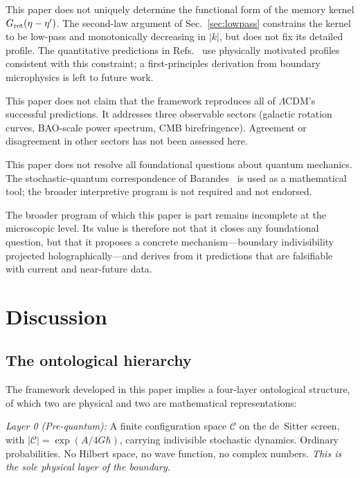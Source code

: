 \documentclass[aps,prd,twocolumn,superscriptaddress,nofootinbib]{revtex4-2}
\begin{document}
This paper does not uniquely determine the functional form of the memory kernel $G_{\rm ret}(\eta - \eta')$. The second-law argument of Sec.~\ref{sec:lowpass} constrains the kernel to be low-pass and monotonically decreasing in $|k|$, but does not fix its detailed profile. The quantitative predictions in Refs.~\cite{PaperI,PaperVIII} use physically motivated profiles consistent with this constraint; a first-principles derivation from boundary microphysics is left to future work.

This paper does not claim that the framework reproduces all of $\Lambda$CDM's successful predictions. It addresses three observable sectors (galactic rotation curves, BAO-scale power spectrum, CMB birefringence). Agreement or disagreement in other sectors has not been assessed here.

This paper does not resolve all foundational questions about quantum mechanics. The stochastic-quantum correspondence of Barandes~\cite{Barandes2025SQT} is used as a mathematical tool; the broader interpretive program is not required and not endorsed.

The broader program of which this paper is part remains incomplete at the microscopic level. Its value is therefore not that it closes any foundational question, but that it proposes a concrete mechanism---boundary indivisibility projected holographically---and derives from it predictions that are falsifiable with current and near-future data.

\section{Discussion}
\label{sec:discussion}

\subsection{The ontological hierarchy}

The framework developed in this paper implies a four-layer ontological structure, of which two are physical and two are mathematical representations:

\emph{Layer 0 (Pre-quantum):} A finite configuration space $\mathcal{C}$ on the de~Sitter screen, with $|\mathcal{C}| = \exp(A/4G\hbar)$, carrying indivisible stochastic dynamics. Ordinary probabilities. No Hilbert space, no wave function, no complex numbers. \emph{This is the sole physical layer of the boundary.}
\end{document}
